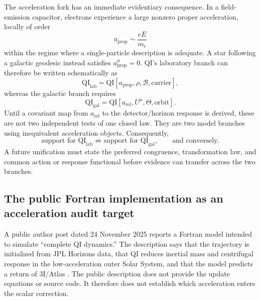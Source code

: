 \documentclass[11pt]{article}
\newcommand{\Bdy}{\mathcal{B}}
\begin{document}
The acceleration fork has an immediate evidentiary consequence. In a field-emission capacitor, electrons experience a large nonzero proper acceleration, locally of order
\begin{equation}
    a_{\mathrm{prop}}\sim \frac{eE}{m_e}
\end{equation}
within the regime where a single-particle description is adequate. A star following a galactic geodesic instead satisfies \(a_{\mathrm{prop}}^{\mu}=0\). QI's laboratory branch can therefore be written schematically as
\begin{equation}
    \mathrm{QI}_{\mathrm{lab}}=\mathrm{QI}[a_{\mathrm{prop}},\rho,\Bdy,\text{carrier}],
\end{equation}
whereas the galactic branch requires
\begin{equation}
    \mathrm{QI}_{\mathrm{gal}}=\mathrm{QI}[a_{\mathrm{rel}},U^{\mu},\Theta,\text{orbit}].
\end{equation}
Until a covariant map from \(a_{\mathrm{rel}}\) to the detector/horizon response is derived, these are not two independent tests of one closed law. They are two model branches using inequivalent acceleration objects. Consequently,
\begin{equation}
    \text{support for }\mathrm{QI}_{\mathrm{lab}}
    \not\Rightarrow
    \text{support for }\mathrm{QI}_{\mathrm{gal}},
    \qquad
    \text{and conversely}.
    \label{eq:branch_nontransfer}
\end{equation}
A future unification must state the preferred congruence, transformation law, and common action or response functional before evidence can transfer across the two branches.

\subsection{The public Fortran implementation as an acceleration audit target}
\label{sec:fortran_audit}

A public author post dated 24 November 2025 reports a Fortran model intended to simulate ``complete QI dynamics.'' The description says that the trajectory is initialized from JPL Horizons data, that QI reduces inertial mass and centrifugal response in the low-acceleration outer Solar System, and that the model predicts a return of 3I/Atlas \cite{McCullochFortran2025}. The public description does not provide the update equations or source code. It therefore does not establish which acceleration enters the scalar correction.
\end{document}
